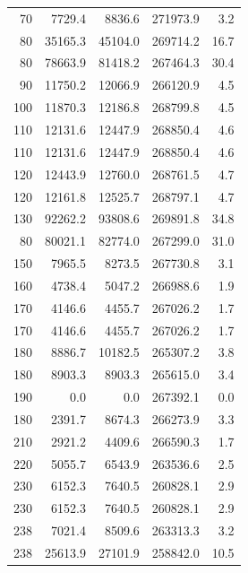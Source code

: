 {\begin{longtable}{rrrrr}
    70 & \num{7729.4} & \num{8836.6} & \num{271973.9} & 3.2 \\
    80 & \num{35165.3} & \num{45104.0} & \num{269714.2} & 16.7 \\
    80 & \num{78663.9} & \num{81418.2} & \num{267464.3} & 30.4 \\
    90 & \num{11750.2} & \num{12066.9} & \num{266120.9} & 4.5 \\
    100 & \num{11870.3} & \num{12186.8} & \num{268799.8} & 4.5 \\
    110 & \num{12131.6} & \num{12447.9} & \num{268850.4} & 4.6 \\
    110 & \num{12131.6} & \num{12447.9} & \num{268850.4} & 4.6 \\
    120 & \num{12443.9} & \num{12760.0} & \num{268761.5} & 4.7 \\
    120 & \num{12161.8} & \num{12525.7} & \num{268797.1} & 4.7 \\
    130 & \num{92262.2} & \num{93808.6} & \num{269891.8} & 34.8 \\
    80 & \num{80021.1} & \num{82774.0} & \num{267299.0} & 31.0 \\
    150 & \num{7965.5} & \num{8273.5} & \num{267730.8} & 3.1 \\
    160 & \num{4738.4} & \num{5047.2} & \num{266988.6} & 1.9 \\
    170 & \num{4146.6} & \num{4455.7} & \num{267026.2} & 1.7 \\
    170 & \num{4146.6} & \num{4455.7} & \num{267026.2} & 1.7 \\
    180 & \num{8886.7} & \num{10182.5} & \num{265307.2} & 3.8 \\
    180 & \num{8903.3} & \num{8903.3} & \num{265615.0} & 3.4 \\
    190 & \num{0.0} & \num{0.0} & \num{267392.1} & 0.0 \\
    180 & \num{2391.7} & \num{8674.3} & \num{266273.9} & 3.3 \\
    210 & \num{2921.2} & \num{4409.6} & \num{266590.3} & 1.7 \\
    220 & \num{5055.7} & \num{6543.9} & \num{263536.6} & 2.5 \\
    230 & \num{6152.3} & \num{7640.5} & \num{260828.1} & 2.9 \\
    230 & \num{6152.3} & \num{7640.5} & \num{260828.1} & 2.9 \\
    238 & \num{7021.4} & \num{8509.6} & \num{263313.3} & 3.2 \\
    238 & \num{25613.9} & \num{27101.9} & \num{258842.0} & 10.5 \\

\end{longtable}}
